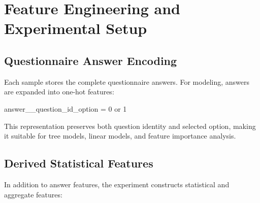 \documentclass[UTF8,a4paper,12pt]{ctexart}
\newenvironment{Shaded}{\begin{snugshade}}{\end{snugshade}}
\newcommand{\NormalTok}[1]{#1}
\renewenvironment{Shaded}{%
    \vspace{0.35em}%
    \begin{tcolorbox}[enhanced,breakable,colback=zjucodebg,colframe=zjucodeframe,boxrule=0.45pt,leftrule=2.2pt,arc=1.6mm,left=1.8mm,right=1.8mm,top=1.2mm,bottom=1.2mm]%
  }{%
    \end{tcolorbox}%
    \vspace{0.25em}%
  }%
\begin{document}
\section{Feature Engineering and Experimental Setup}\label{feature-engineering-and-experimental-setup}

\subsection{Questionnaire Answer Encoding}\label{questionnaire-answer-encoding}

Each sample stores the complete questionnaire answers. For modeling, answers are expanded into one-hot features:

\begin{Shaded}
\begin{Highlighting}[]
\NormalTok{answer\_\_question\_id\_option = 0 or 1}
\end{Highlighting}
\end{Shaded}

This representation preserves both question identity and selected option, making it suitable for tree models, linear models, and feature importance analysis.

\subsection{Derived Statistical Features}\label{derived-statistical-features}

In addition to answer features, the experiment constructs statistical and aggregate features:
\end{document}
